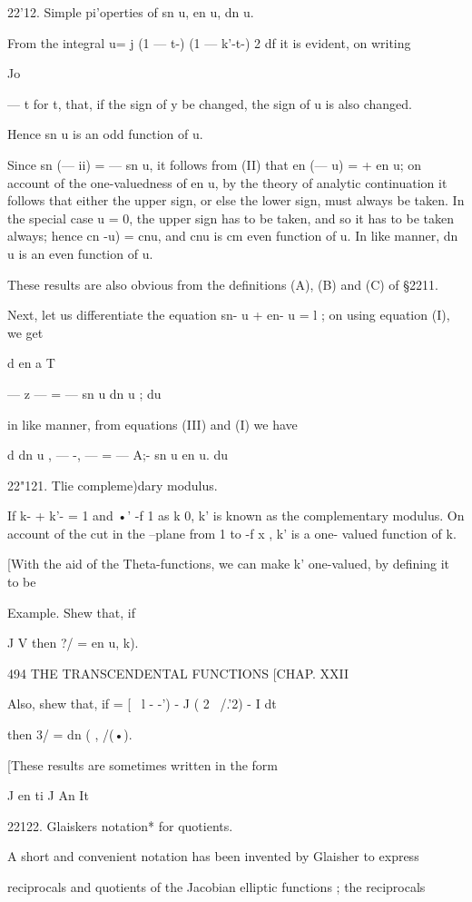 22'12. Simple pi'operties of sn u, en u, dn u.

From the integral u= j (1 — t-) (1 — k'-t-) 2 df it is evident, on
writing

Jo

— t for t, that, if the sign of y be changed, the sign of u is also
changed.

Hence sn u is an odd function of u.

Since sn (— ii) = — sn u, it follows from (II) that en (— u) = + en u;
on account of the one-valuedness of en u, by the theory of analytic
continuation it follows that either the upper sign, or else the lower
sign, must always be taken. In the special case u = 0, the upper sign
has to be taken, and so it has to be taken always; hence cn -u) = cnu,
and cnu is cm even function of u. In like manner, dn u is an even
function of u.

These results are also obvious from the definitions (A), (B) and (C)
of §2211.

Next, let us differentiate the equation sn- u + en- u = l ; on using
equation (I), we get

d en a T

— z — = — sn u dn u ; du

in like manner, from equations (III) and (I) we have

d dn u , — -, — = — A;- sn u en u. du

22"121. Tlie compleme)dary modulus.

If k- + k'- = 1 and •' -f 1 as k 0, k' is known as the complementary
modulus. On account of the cut in the --plane from 1 to -f x , k' is a
one- valued function of k.

[With the aid of the Theta-functions, we can make k' one-valued, by
defining it to be

Example. Shew that, if

J V then ?/ = en u, k).

494 THE TRANSCENDENTAL FUNCTIONS [CHAP. XXII

Also, shew that, if = [ \ l - -') - J ( 2 \ /.'2) - I dt

then 3/ = dn ( , /(•).

[These results are sometimes written in the form

J en ti J An It

22122. Glaiskers notation* for quotients.

A short and convenient notation has been invented by Glaisher to
express

reciprocals and quotients of the Jacobian elliptic functions ; the
reciprocals

